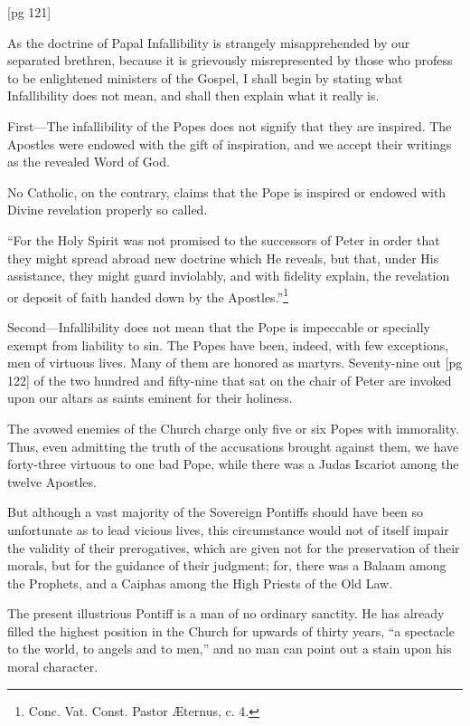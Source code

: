 [pg 121]


As the doctrine of Papal Infallibility is
strangely misapprehended by our separated
brethren, because it is grievously
misrepresented by those who profess to be enlightened
ministers of the Gospel, I shall begin
by stating what Infallibility does not mean, and
shall then explain what it really is.

First—The infallibility of the Popes does not
signify that they are inspired. The Apostles were
endowed with the gift of inspiration, and we accept
their writings as the revealed Word of God.

No Catholic, on the contrary, claims that the
Pope is inspired or endowed with Divine revelation
properly so called.

“For the Holy Spirit was not promised to the
successors of Peter in order that they might
spread abroad new doctrine which He reveals, but
that, under His assistance, they might guard inviolably,
and with fidelity explain, the revelation
or deposit of faith handed down by the Apostles.”\footnote{Conc.
Vat. Const. Pastor Æternus, c. 4.}

Second—Infallibility does not mean that the
Pope is impeccable or specially exempt from liability
to sin. The Popes have been, indeed, with
few exceptions, men of virtuous lives. Many of
them are honored as martyrs. Seventy-nine out
[pg 122]
of the two hundred and fifty-nine that sat on the
chair of Peter are invoked upon our altars as
saints eminent for their holiness.

The avowed enemies of the Church charge only
five or six Popes with immorality. Thus, even
admitting the truth of the accusations brought
against them, we have forty-three virtuous to one
bad Pope, while there was a Judas Iscariot among
the twelve Apostles.

But although a vast majority of the Sovereign
Pontiffs should have been so unfortunate as to
lead vicious lives, this circumstance would not of
itself impair the validity of their prerogatives,
which are given not for the preservation of their
morals, but for the guidance of their judgment;
for, there was a Balaam among the Prophets, and
a Caiphas among the High Priests of the Old
Law.

The present illustrious Pontiff is a man of no
ordinary sanctity. He has already filled the highest
position in the Church for upwards of thirty
years, “a spectacle to the world, to angels and
to men,” and no man can point out a stain upon
his moral character.

